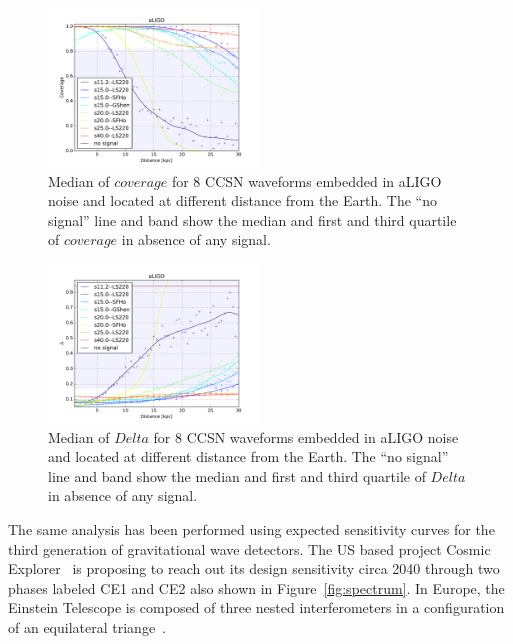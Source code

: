 \begin{figure}
  \centering
  \includegraphics[width=0.5\textwidth]{plots/aLIGO_coverage_allwvfs}
 \caption{Median of $coverage$ for 8 CCSN waveforms embedded in aLIGO noise and located at different distance from the Earth. The ``no signal'' line and band show the median and first and third quartile of $coverage$ in absence of any signal.} \label{fig:aLIGO_cov_allwvf}
\end{figure}

\begin{figure}
  \centering
  \includegraphics[width=0.5\textwidth]{plots/aLIGO_delta_allwvfs}
 \caption{Median of $Delta$ for 8 CCSN waveforms embedded in aLIGO noise and located at different distance from the Earth. The ``no signal'' line and band show the median and first and third quartile of $Delta$ in absence of any signal.} \label{fig:aLIGO_prec_allwvf}
\end{figure}

The same analysis has been performed using expected sensitivity curves for the third generation of
gravitational wave detectors. The US based project Cosmic Explorer~\cite{reitze2019cosmic} is proposing
to reach out its design sensitivity circa 2040 through two phases labeled CE1 and CE2 also shown in
Figure~\ref{fig:spectrum}. In Europe, the Einstein Telescope is composed of three nested interferometers
in a configuration of an equilateral triange~\cite{Hild_2011}.



